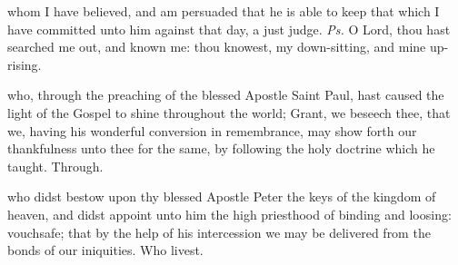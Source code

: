 \introit
{} whom I have believed, and am persuaded that he is able to keep that which I have committed unto him against that day, a just judge. \textit{Ps.} O Lord, thou hast searched me out, and known me: thou knowest, my down-sitting, and mine up-rising.

\collect
{} who, through the preaching of the blessed Apostle Saint Paul, hast caused the light of the Gospel to shine throughout the world; Grant, we beseech thee, that we, having his wonderful conversion in remembrance, may show forth our thankfulness unto thee for the same, by following the holy doctrine which he taught. Through.

 who didst bestow upon thy blessed Apostle Peter the keys of the kingdom of heaven, and didst appoint unto him the high priesthood of binding and loosing: vouchsafe; that by the help of his intercession we may be delivered from the bonds of our iniquities. Who livest.

